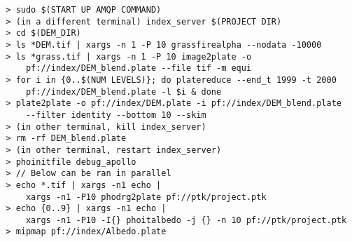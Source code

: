\begin{verbatim}
  > sudo $(START UP AMQP COMMAND)
  > (in a different terminal) index_server $(PROJECT DIR)
  > cd $(DEM_DIR)
  > ls *DEM.tif | xargs -n 1 -P 10 grassfirealpha --nodata -10000
  > ls *grass.tif | xargs -n 1 -P 10 image2plate -o
      pf://index/DEM_blend.plate --file tif -m equi
  > for i in {0..$(NUM LEVELS)}; do platereduce --end_t 1999 -t 2000
      pf://index/DEM_blend.plate -l $i & done
  > plate2plate -o pf://index/DEM.plate -i pf://index/DEM_blend.plate
      --filter identity --bottom 10 --skim
  > (in other terminal, kill index_server)
  > rm -rf DEM_blend.plate
  > (in other terminal, restart index_server)
  > phoinitfile debug_apollo
  > // Below can be ran in parallel
  > echo *.tif | xargs -n1 echo |
      xargs -n1 -P10 phodrg2plate pf://ptk/project.ptk
  > echo {0..9} | xargs -n1 echo |
      xargs -n1 -P10 -I{} phoitalbedo -j {} -n 10 pf://ptk/project.ptk
  > mipmap pf://index/Albedo.plate
\end{verbatim}
